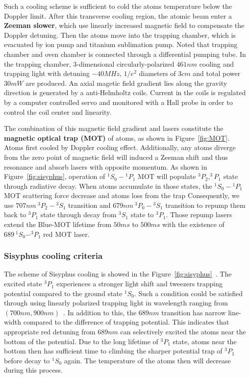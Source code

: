 \documentclass[11pt]{article}
\begin{document}
Such a cooling scheme is sufficient to cold the atoms temperature below the Doppler limit.
After this transverse cooling region, the atomic beam enter a \textbf{Zeeman slower}, which use linearly increased magnetic field to compensate the Doppler detuning. 
Then the atoms move into the trapping chamber, which is evacuated by ion pump and titanium sublimation pump. 
Noted that trapping chamber and oven chamber is connected through a differential pumping tube.
In the trapping chamber, 3-dimensional circularly-polarized $461nm$ cooling and trapping light with detuning $-40MHz$, $1/e^2$ diameters of  $3cm$ and total power $30 mW$ are produced. 
An axial magetic field gradient lies along the gravity direction is generated by a anti-Helmholtz coils.
Current in the coils is regulated by a computer controlled servo and monitored with a Hall probe in order to control the coil center and linearity. 

The combination of this magnetic field gradient and lasers constitute the \textbf{magnetic optical trap (MOT)} of atoms, as shown in Figure~\ref{fig:MOT}. 
Atoms first cooled by Doppler cooling effect. 
Additionally, any atoms diverge from the zero point of magnetic field will induced a Zeeman shift and thus resonance and absorb lasers with opposite momentum.  
As shown in Figure~\ref{fig:sisyphus}, operation of $^1S_0 - {^1P_1}$ MOT will populate $^3P_2, ^3P_1$ state through radiative decay.
When atoms accumulate in those states, the $^1S_0 - {^1P_1}$ MOT scattering force decrease and atoms loss from the trap
Consequently, we use $707nm~^3P_2 - {^3S_1}$ transition and $679nm~^3P_0-{^3S_1}$ transition to repump them back to $^3P_1$ state through decay from $^3S_1$ state to $^3 P_1$. 
Those repump lasers extend the Blue-MOT lifetime from $50ms$ to $500ms$ with the existence of $689~^1S_0 - ^3P_1$ red MOT laser.

\subsubsection{Sisyphus cooling criteria}

The scheme of Sisyphus cooling is showed in the  Figure~\ref{fig:sisyphus}~\cite{Covey_2019}. 
The excited state $^3P_1$ experiences a stronger light shift and tweezers trapping potential compared to the ground state $^1S_0$. 
Such a condition could be satisfied through using linearly polarized trapping light in wavelength ranging from $(700nm,900nm)$~\cite{Covey_2019}.  
In addition to this, the $689nm$ transition has narrow line-width compared to the difference of trapping potential.
This indicates that appropriate red detuning from $689nm$ can selectively excited the atoms near the bottom of the potential.
Due to the long lifetime of $^3P_1$ state, atoms near the bottom then has sufficient time to climbing the sharper potential trap of $^3P_1$  before decay to $^1S_0$ again. 
The temperature of the atoms then will decrease during this process.
\end{document}
